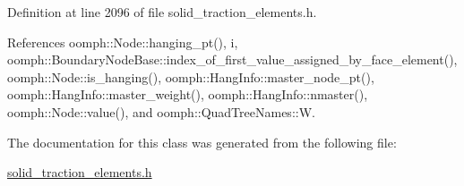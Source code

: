 Definition at line 2096 of file solid\+\_\+traction\+\_\+elements.\+h.



References oomph\+::\+Node\+::hanging\+\_\+pt(), i, oomph\+::\+Boundary\+Node\+Base\+::index\+\_\+of\+\_\+first\+\_\+value\+\_\+assigned\+\_\+by\+\_\+face\+\_\+element(), oomph\+::\+Node\+::is\+\_\+hanging(), oomph\+::\+Hang\+Info\+::master\+\_\+node\+\_\+pt(), oomph\+::\+Hang\+Info\+::master\+\_\+weight(), oomph\+::\+Hang\+Info\+::nmaster(), oomph\+::\+Node\+::value(), and oomph\+::\+Quad\+Tree\+Names\+::W.



The documentation for this class was generated from the following file\+:\begin{DoxyCompactItemize}
\item 
\hyperlink{solid__traction__elements_8h}{solid\+\_\+traction\+\_\+elements.\+h}\end{DoxyCompactItemize}
